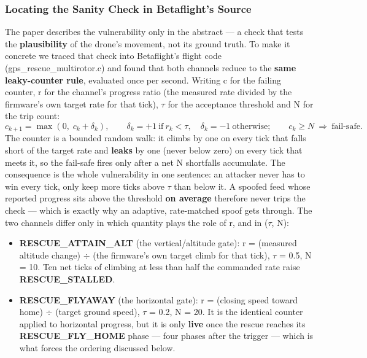 \documentclass[11pt]{article}
\begin{document}
\subsubsection*{Locating the Sanity Check in Betaflight's Source}
The paper describes the vulnerability only in the abstract — a check that tests the \textbf{plausibility} of the drone's movement, not its ground truth. To make it concrete we traced that check into Betaflight's flight code (gps\_\allowbreak{}rescue\_\allowbreak{}multirotor.c) and found that both channels reduce to the \textbf{same leaky-counter rule}, evaluated once per second. Writing c for the failing counter, r for the channel's progress ratio (the measured rate divided by the firmware's own target rate for that tick), $\tau$ for the acceptance threshold and N for the trip count:
\[
c_{k+1} = \max\!\left(0,\; c_k + \delta_k\right), \qquad
\delta_k = +1 \ \mbox{if}\ r_k < \tau, \quad \delta_k = -1 \ \mbox{otherwise}; \qquad
c_k \ge N \ \Rightarrow \ \mbox{fail-safe}.
\]
The counter is a bounded random walk: it climbs by one on every tick that falls short of the target rate and \textbf{leaks} by one (never below zero) on every tick that meets it, so the fail-safe fires only after a net N shortfalls accumulate. The consequence is the whole vulnerability in one sentence: an attacker never has to win every tick, only keep more ticks above $\tau$ than below it. A spoofed feed whose reported progress sits above the threshold \textbf{on average} therefore never trips the check — which is exactly why an adaptive, rate-matched spoof gets through. The two channels differ only in which quantity plays the role of r, and in ($\tau$, N):
\begin{itemize}
\item \textbf{RESCUE\_\allowbreak{}ATTAIN\_\allowbreak{}ALT} (the vertical/altitude gate): r = (measured altitude change) $\div$ (the firmware's own target climb for that tick), $\tau$ = 0.5, N = 10. Ten net ticks of climbing at less than half the commanded rate raise \textbf{RESCUE\_\allowbreak{}STALLED}.
\item \textbf{RESCUE\_\allowbreak{}FLYAWAY} (the horizontal gate): r = (closing speed toward home) $\div$ (target ground speed), $\tau$ = 0.2, N = 20. It is the identical counter applied to horizontal progress, but it is only \textbf{live} once the rescue reaches its \textbf{RESCUE\_\allowbreak{}FLY\_\allowbreak{}HOME} phase — four phases after the trigger — which is what forces the ordering discussed below.
\end{itemize}
\end{document}
